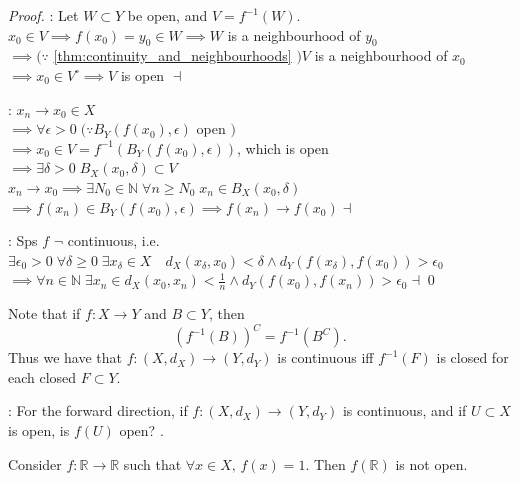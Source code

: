 \documentclass[notoc,notitlepage]{tufte-book}
\begin{document}
\begin{proof}
   : Let $W \subset Y$ be open, and $V = f^{-1}(W)$. \\
  $x_0 \in V \implies f(x_0) = y_0 \in W \implies W$ is a neighbourhood of $y_0$ \\
  $\implies (\because $ \cref{thm:continuity_and_neighbourhoods} $) V$ is a neighbourhood of $x_0$ \\
  $\implies x_0 \in V^\circ \implies V$ is open $\dashv$

  \noindent{} : $x_n \to x_0 \in X$ \\
  $\implies \forall \epsilon > 0 \; (\because B_Y(f(x_0), \epsilon) $ open $)$ \\ 
  $\implies x_0 \in V = f^{-1}( B_Y(f(x_0), \epsilon) )$, which is open \\
  $\implies \exists \delta > 0 \; B_X(x_0, \delta) \subset V$ \\
  $x_n \to x_0 \implies \exists N_0 \in \mathbb{N} \; \forall n \geq N_0 \; x_n \in B_X(x_0, \delta)$ \\
  $\implies f(x_n) \in B_Y(f(x_0), \epsilon) \implies f(x_n) \to f(x_0) \dashv$

  \noindent{} : Sps $f$ $\neg$ continuous, i.e. \\
  $\exists \epsilon_0 > 0 \; \forall \delta \geq 0 \; \exists x_\delta \in X \quad d_X(x_\delta, x_0) < \delta \land d_Y(f(x_\delta), f(x_0)) > \epsilon_0$ \\
  $\implies \forall n \in \mathbb{N} \; \exists x_n \in d_X(x_0, x_n) < \frac{1}{n} \land d_Y(f(x_0), f(x_n)) > \epsilon_0 \dashv$\qed\
\end{proof}

\begin{remark}
  Note that if $f: X \to Y$ and $B \subset Y$, then
  \begin{equation*}
    {( f^{-1}(B) )}^C = f^{-1}\left( B^C \right).
  \end{equation*}
  Thus we have that $f : (X, d_X) \to (Y, d_Y)$ is continuous iff $f^{-1}(F)$ is closed for each closed $F \subset Y$.
\end{remark}

: For the forward direction, if $f : (X, d_X) \to (Y, d_Y)$ is continuous, and if $U \subset X$ is open, is $f(U)$ open? .

\begin{eg}
  Consider $f : \mathbb{R} \to \mathbb{R}$ such that $\forall x \in X, \, f(x) = 1$. Then $f(\mathbb{R})$ is not open.
\end{eg}
\end{document}
